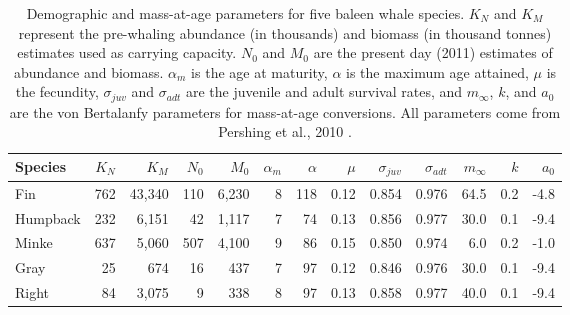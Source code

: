\begin{table}

\caption{\label{tab:species_params}Demographic and mass-at-age parameters for five baleen whale species. $K_N$ and $K_M$ represent the pre-whaling abundance (in thousands) and biomass (in thousand tonnes) estimates used as carrying capacity. $N_0$ and $M_0$ are the present day (2011) estimates of abundance and biomass. $\alpha_m$ is the age at maturity, $\alpha$ is the maximum age attained, $\mu$ is the fecundity, $\sigma_{juv}$ and $\sigma_{adt}$ are the juvenile and adult survival rates, and $m_\infty$, $k$, and $a_0$ are the von Bertalanfy parameters for mass-at-age conversions. All parameters come from Pershing et al., 2010 \cite{pershing2010impact}.}
\centering
\begin{tabular}[t]{lrrrrrrrrrrrr}
\toprule
Species & $K_N$ & $K_M$ & $N_0$ & $M_0$ & $\alpha_m$ & $\alpha$ & $\mu$ & $\sigma_{juv}$ & $\sigma_{adt}$ & $m_\infty$ & $k$ & $a_0$\\
\midrule
Fin & 762 & 43,340 & 110 & 6,230 & 8 & 118 & 0.12 & 0.854 & 0.976 & 64.5 & 0.2 & -4.8\\
Humpback & 232 & 6,151 & 42 & 1,117 & 7 & 74 & 0.13 & 0.856 & 0.977 & 30.0 & 0.1 & -9.4\\
Minke & 637 & 5,060 & 507 & 4,100 & 9 & 86 & 0.15 & 0.850 & 0.974 & 6.0 & 0.2 & -1.0\\
Gray & 25 & 674 & 16 & 437 & 7 & 97 & 0.12 & 0.846 & 0.976 & 30.0 & 0.1 & -9.4\\
Right & 84 & 3,075 & 9 & 338 & 8 & 97 & 0.13 & 0.858 & 0.977 & 40.0 & 0.1 & -9.4\\
\bottomrule
\end{tabular}
\end{table}